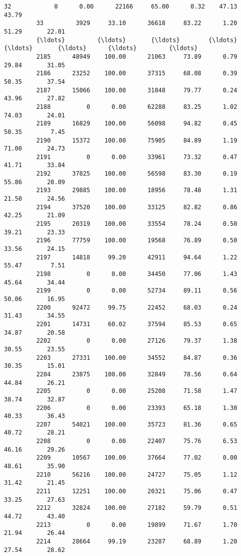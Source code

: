 \documentclass[11pt]{llncs}
\begin{document}
\begin{Verbatim}[commandchars=\\\{\}]
         32            0      0.00      22166     65.00      0.32    47.13       43.79   
         33         3929     33.10      36618     83.22      1.20    51.29       22.01   
         {\ldots}         {\ldots}       {\ldots}        {\ldots}       {\ldots}       {\ldots}      {\ldots}         {\ldots}   
         2185      48949    100.00      21063     73.89      0.79    29.84       31.05   
         2186      23252    100.00      37315     68.08      0.39    50.35       37.54   
         2187      15066    100.00      31848     79.77      0.24    43.96       27.82   
         2188          0      0.00      62288     83.25      1.02    74.03       24.01   
         2189      16829    100.00      56098     94.82      0.45    50.35        7.45   
         2190      15372    100.00      75905     84.89      1.19    71.00       24.73   
         2191          0      0.00      33961     73.32      0.47    41.71       33.84   
         2192      37825    100.00      56598     83.30      0.19    55.86       28.09   
         2193      29885    100.00      18956     78.48      1.31    21.50       24.56   
         2194      37520    100.00      33125     82.82      0.86    42.25       21.09   
         2195      20319    100.00      33554     78.24      0.50    39.21       23.33   
         2196      77759    100.00      19568     76.89      0.50    33.56       24.15   
         2197      14818     99.20      42911     94.64      1.22    55.47        7.51   
         2198          0      0.00      34450     77.06      1.43    45.64       34.44   
         2199          0      0.00      52734     89.11      0.56    50.06       16.95   
         2200      92472     99.75      22452     68.03      0.24    31.43       34.55   
         2201      14731     60.02      37594     85.53      0.65    34.87       20.58   
         2202          0      0.00      27126     79.37      1.38    30.55       23.55   
         2203      27331    100.00      34552     84.87      0.36    30.35       15.01   
         2204      23875    100.00      32849     78.56      0.64    44.84       26.21   
         2205          0      0.00      25208     71.58      1.47    38.74       32.87   
         2206          0      0.00      23393     65.18      1.30    40.33       36.43   
         2207      54021    100.00      35723     81.36      0.65    40.72       28.21   
         2208          0      0.00      22407     75.76      6.53    46.16       29.26   
         2209      10567    100.00      37664     77.02      0.00    48.61       35.90   
         2210      56216    100.00      24727     75.05      1.12    31.42       21.45   
         2211      12251    100.00      20321     75.06      0.47    33.25       27.63   
         2212      32824    100.00      27182     59.79      0.51    44.72       43.40   
         2213          0      0.00      19899     71.67      1.70    21.94       26.44   
         2214      28664     99.19      23287     68.89      1.20    27.54       28.62   
         

\end{Verbatim}
\end{document}
